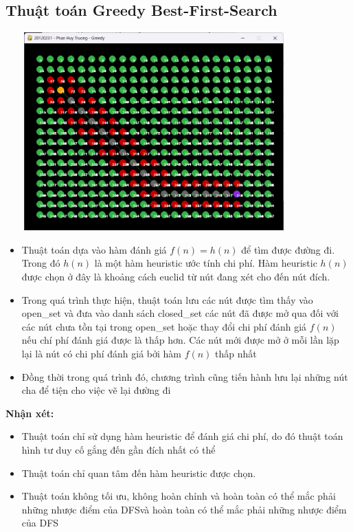 \documentclass{article}
\begin{document}
\subsection{Thuật toán Greedy Best-First-Search}
    \centerline{\includegraphics[width=4.5in, height=3in]{image/greedy_stimulation.png}}
    \vspace{2\baselineskip}
    \begin{itemize}
        \item Thuật toán dựa vào hàm đánh giá $f(n) = h(n)$ để tìm được đường đi. Trong đó $h(n)$ là một hàm heuristic ước tính chi phí. Hàm heuristic $h(n)$ được chọn ở đây là khoảng cách euclid từ nút đang xét cho đến nút đích. 
        \item Trong quá trình thực hiện, thuật toán lưu các nút được tìm thấy vào open\_set và đưa vào danh sách closed\_set các nút đã được mở qua đối với các nút chưa tồn tại trong open\_set hoặc thay đổi chi phí đánh giá $f(n)$ nếu chí phí đánh giá được là thấp hơn. Các nút mới được mở ở mỗi lần lặp lại là nút có chi phí đánh giá bởi hàm $f(n)$ thấp nhất
        \item Đồng thời trong quá trình đó, chương trình cũng tiến hành lưu lại những nút cha để tiện cho việc vẽ lại đường đi
    \end{itemize}
    \textbf{Nhận xét: }
    \begin{itemize}
        \item Thuật toán chỉ sử dụng hàm heuristic để đánh giá chi phí, do đó thuật toán hình tư duy cố gắng đến gần đích nhất có thể
        \item Thuật toán chỉ quan tâm đến hàm heuristic được chọn.
        \item Thuật toán không tối ưu, không hoàn chỉnh và hoàn toàn có thể mắc phải những nhược điểm của DFSvà hoàn toàn có thể mắc phải những nhược điểm của DFS
    \end{itemize}
\end{document}
